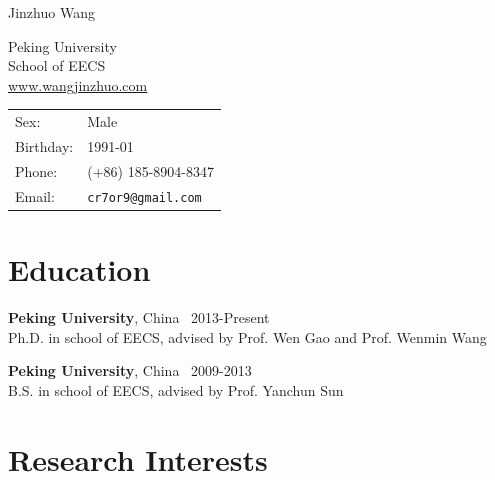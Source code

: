 \documentclass[letterpaper]{article}
\def\name{Jinzhuo Wang}
\renewenvironment{itemize}{
  \begin{list}{}{
    \setlength{\leftmargin}{1.5em}
  }
}{
  \end{list}
}
\begin{document}
{\huge \name}


\vspace{0.25in}


\begin{minipage}{0.45\linewidth}
  Peking University \\
  School of EECS  \\
    \href{www.wangjinzhuo.com}{\underline{www.wangjinzhuo.com}}
\end{minipage}
\begin{minipage}{0.45\linewidth}
  \begin{tabular}{ll}
    Sex: & Male \\
    Birthday: & 1991-01 \\
    Phone: & (+86) 185-8904-8347 \\
    Email: & \tt cr7or9@gmail.com \\
  \end{tabular}
\end{minipage}

%


\section*{Education}

\begin{itemize}
  \item \textbf{Peking University},  China \ 2013-Present \\
  Ph.D. in school of EECS, advised by Prof. Wen Gao and Prof. Wenmin Wang 
  \item \textbf{Peking University},  China \ 2009-2013 \\
  B.S. in school of EECS, advised by Prof. Yanchun Sun
\end{itemize}


\section*{Research Interests}
\end{document}
